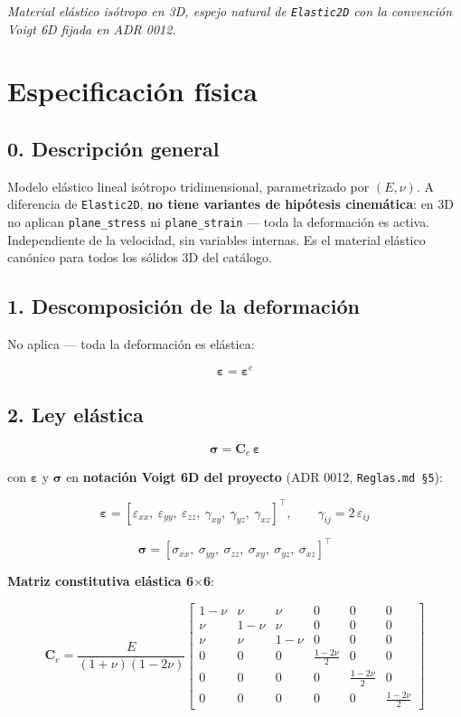 \documentclass[11pt,letterpaper,oneside]{report}
\begin{document}
\textit{Material elástico isótropo en 3D, espejo natural de \texttt{Elastic2D} con la convención Voigt 6D fijada en ADR 0012.}



\section{Especificación física}

\subsection{0. Descripción general}

Modelo elástico lineal isótropo tridimensional, parametrizado por $(E, \nu)$. A diferencia de \texttt{Elastic2D}, \textbf{no tiene variantes de hipótesis cinemática}: en 3D no aplican \texttt{plane\_stress} ni \texttt{plane\_strain} --- toda la deformación es activa. Independiente de la velocidad, sin variables internas. Es el material elástico canónico para todos los sólidos 3D del catálogo.

\subsection{1. Descomposición de la deformación}

No aplica --- toda la deformación es elástica:

\[
\boldsymbol\varepsilon = \boldsymbol\varepsilon^e
\]

\subsection{2. Ley elástica}

\[
\boldsymbol\sigma = \mathbf C_e\,\boldsymbol\varepsilon
\]

con $\boldsymbol\varepsilon$ y $\boldsymbol\sigma$ en \textbf{notación Voigt 6D del proyecto} (ADR 0012, \texttt{Reglas.md §5}):

\[
\boldsymbol\varepsilon = [\varepsilon_{xx},\ \varepsilon_{yy},\ \varepsilon_{zz},\ \gamma_{xy},\ \gamma_{yz},\ \gamma_{xz}]^\top, \qquad \gamma_{ij} = 2\,\varepsilon_{ij}
\]

\[
\boldsymbol\sigma = [\sigma_{xx},\ \sigma_{yy},\ \sigma_{zz},\ \sigma_{xy},\ \sigma_{yz},\ \sigma_{xz}]^\top
\]

\textbf{Matriz constitutiva elástica 6\ensuremath{\times}6}:

\[
\mathbf C_e = \frac{E}{(1+\nu)(1-2\nu)}\begin{bmatrix}
1-\nu & \nu & \nu & 0 & 0 & 0 \\
\nu & 1-\nu & \nu & 0 & 0 & 0 \\
\nu & \nu & 1-\nu & 0 & 0 & 0 \\
0 & 0 & 0 & \tfrac{1-2\nu}{2} & 0 & 0 \\
0 & 0 & 0 & 0 & \tfrac{1-2\nu}{2} & 0 \\
0 & 0 & 0 & 0 & 0 & \tfrac{1-2\nu}{2}
\end{bmatrix}
\]
\end{document}
